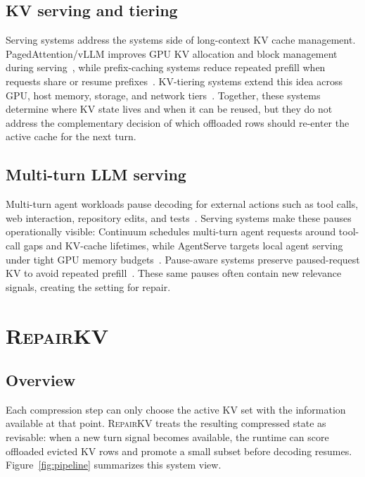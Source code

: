\documentclass{article}
\newcommand{\repairkv}{\textsc{RepairKV}}
\begin{document}
\subsection{KV serving and tiering}
Serving systems address the systems side of long-context KV cache management.
PagedAttention/vLLM improves GPU KV allocation and block management
during serving~\citep{vllm}, while prefix-caching systems reduce repeated prefill when requests share or resume prefixes~\citep{lmcache,ttkv}. KV-tiering systems extend this idea across GPU, host memory, storage, and network tiers~\citep{lmcache,ttkv,agentserve}. {Together, these systems determine where KV state lives and when it can be reused, but they do not address the complementary decision of which offloaded rows should re-enter the active cache for the next turn.}

\subsection{Multi-turn LLM serving}
Multi-turn agent workloads pause decoding for external actions such as tool calls, web interaction, repository edits, and tests~\citep{toollm,webarena,swebench,agentbench}. Serving systems make these pauses operationally visible: Continuum schedules multi-turn agent requests around tool-call gaps and KV-cache lifetimes, while AgentServe targets local agent serving under tight GPU memory budgets~\citep{continuum,agentserve}. Pause-aware systems preserve paused-request KV to avoid repeated prefill~\citep{infercept,continuum,cachedattention}. {These same pauses often contain new relevance signals, creating the setting for repair.}

\section{\repairkv{}}
\label{sec:method}

\subsection{Overview}
Each compression step can only choose the active KV set with the information available at that point.
{\repairkv{} treats the resulting compressed state as revisable: when a new turn signal becomes available, the runtime can score offloaded evicted KV rows and promote a small subset before decoding resumes.}
Figure~\ref{fig:pipeline} summarizes this system view.
\end{document}
